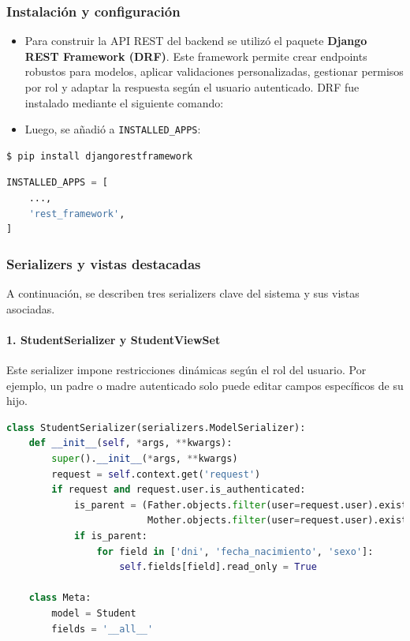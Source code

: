 \documentclass{article}
\begin{document}
    \subsubsection*{Instalación y configuración}
    \begin{itemize}
        \item Para construir la API REST del backend se utilizó el paquete \textbf{Django REST Framework (DRF)}. Este framework permite crear endpoints robustos para modelos, aplicar validaciones personalizadas, gestionar permisos por rol y adaptar la respuesta según el usuario autenticado. DRF fue instalado mediante el siguiente comando:
        \item Luego, se añadió a \texttt{INSTALLED\_APPS}:
    \end{itemize}
    \begin{lstlisting}[language=bash, caption={Instalación de Django REST Framework}, numbers=none]
        $ pip install djangorestframework
    \end{lstlisting}



\begin{lstlisting}[language=Python, caption={Agregar DRF al proyecto}, numbers=none]
INSTALLED_APPS = [
    ...,
    'rest_framework',
]
\end{lstlisting}

\subsubsection*{Serializers y vistas destacadas}

A continuación, se describen tres serializers clave del sistema y sus vistas asociadas.

\paragraph{1. StudentSerializer y StudentViewSet}

Este serializer impone restricciones dinámicas según el rol del usuario. Por ejemplo, un padre o madre autenticado solo puede editar campos específicos de su hijo.

\begin{lstlisting}[language=Python, caption={StudentSerializer simplificado}]
class StudentSerializer(serializers.ModelSerializer):
    def __init__(self, *args, **kwargs):
        super().__init__(*args, **kwargs)
        request = self.context.get('request')
        if request and request.user.is_authenticated:
            is_parent = (Father.objects.filter(user=request.user).exists() or 
                         Mother.objects.filter(user=request.user).exists())
            if is_parent:
                for field in ['dni', 'fecha_nacimiento', 'sexo']:
                    self.fields[field].read_only = True

    class Meta:
        model = Student
        fields = '__all__'
\end{lstlisting}
\end{document}
